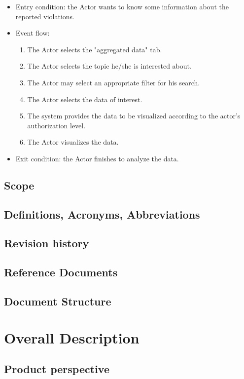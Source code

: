 \documentclass[12pt]{article}
\begin{document}
\begin{itemize}
\begin{itemize}
                \item Entry condition: the Actor wants to know some information about the reported violations.
                \item Event flow:
                \begin{enumerate}
                    \item The Actor selects the "aggregated data" tab.
                    \item The Actor selects the topic he/she is interested about.
                    \item The Actor may select an appropriate filter for his search.
                    \item The Actor selects the data of interest.
                    \item The system provides the data to be visualized according to the actor's authorization level.
                    \item The Actor visualizes the data.
                \end{enumerate}
                \item Exit condition: the Actor finishes to analyze the data.
            \end{itemize}
        \end{itemize}
    \subsection{Scope}
    \subsection{Definitions, Acronyms, Abbreviations}
    \subsection{Revision history}
    \subsection{Reference Documents}
    \subsection{Document Structure}
    
\newpage
\section{Overall Description}
    \subsection{Product perspective}
\end{document}
